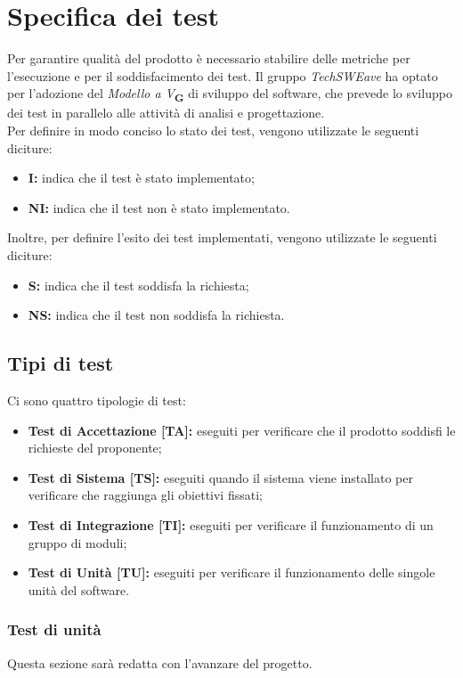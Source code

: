 \section{Specifica dei test}
Per garantire qualità del prodotto è necessario stabilire delle metriche per l’esecuzione e per il soddisfacimento dei test.
Il gruppo \textit{TechSWEave} ha optato per l'adozione del \textit{Modello a V}\textsubscript{\textbf{G}} di sviluppo del software, che
prevede lo sviluppo dei test in parallelo alle attività di analisi e progettazione.\\
Per definire in modo conciso lo stato dei test, vengono utilizzate le seguenti diciture:
\begin{itemize}
    \item \textbf{I:} indica che il test è stato implementato;
    \item \textbf{NI:} indica che il test non è stato implementato.
\end{itemize}
Inoltre, per definire l'esito dei test implementati, vengono utilizzate le seguenti diciture:
\begin{itemize}
    \item \textbf{S:} indica che il test soddisfa la richiesta;
    \item \textbf{NS:} indica che il test non soddisfa la richiesta.
\end{itemize}
\subsection{Tipi di test}
Ci sono quattro tipologie di test:
\begin{itemize}
    \item \textbf{Test di Accettazione [TA]:} eseguiti per verificare che il prodotto soddisfi le richieste del proponente;
    \item \textbf{Test di Sistema [TS]:} eseguiti quando il sistema viene installato per verificare che raggiunga gli obiettivi fissati;
    \item \textbf{Test di Integrazione [TI]:} eseguiti per verificare il funzionamento di un gruppo di moduli;
    \item \textbf{Test di Unit\`a [TU]:} eseguiti per verificare il funzionamento delle singole unit\`a del software.
\end{itemize}
\subsubsection{Test di unità}
Questa sezione sarà redatta con l'avanzare del progetto.
